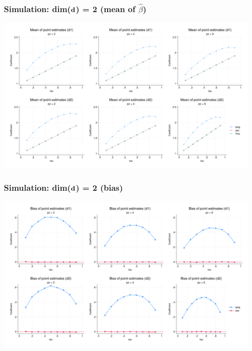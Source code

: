 \documentclass[11pt]{beamer}
\begin{document}
\begin{frame}
  \frametitle{Simulation: dim($\mathbf{d}$) = 2 (mean of $\hat{\beta}$)}
  \begin{center} 
\includegraphics[scale=0.2]{eps/mbeta_d2}
\end{center}
\end{frame}

\begin{frame}
  \frametitle{Simulation: dim($\mathbf{d}$) = 2 (bias)}
  \begin{center} 
\includegraphics[scale=0.2]{eps/mbias_d2}
\end{center}
\end{frame}
\end{document}
